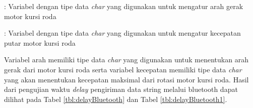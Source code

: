 \begin{description}[nolistsep]
  \item[Keterangan]
  \item[Arah] : Variabel dengan tipe data \emph{char} yang digunakan untuk mengatur arah gerak motor kursi roda
  \item[Kecepatan] : Variabel dengan tipe data \emph{char} yang digunakan untuk mengatur kecepatan putar motor kursi roda 
\end{description}

Variabel arah memiliki tipe data \emph{char} yang digunakan untuk menentukan arah gerak dari motor kursi roda serta variabel kecepatan memiliki tipe data \emph{char} yang akan menentukan kecepatan maksimal dari rotasi motor kursi roda. Hasil dari pengujian waktu \emph{delay} pengiriman data string melalui bluetooth dapat dilihat pada Tabel \ref{tbl:delayBluetooth} dan Tabel \ref{tbl:delayBluetooth1}.

